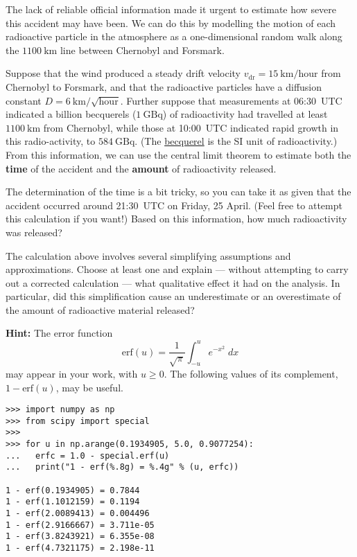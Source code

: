 \documentclass[12 pt]{article} %
\newcommand{\vdr}{\ensuremath{v_{\mathrm{dr}}} }
\newcommand{\showmarks}[1]{\rightline{\texttt{[#1 marks]}}} %
\begin{document}
The lack of reliable official information made it urgent to estimate how severe this accident may have been.
We can do this by modelling the motion of each radioactive particle in the atmosphere as a one-dimensional random walk along the $1100~\mathrm{km}$ line between Chernobyl and Forsmark.

Suppose that the wind produced a steady drift velocity $\vdr = 15~\mathrm{km}/\mathrm{hour}$ from Chernobyl to Forsmark, and that the radioactive particles have a diffusion constant $D = 6~\mathrm{km}/\sqrt{\mathrm{hour}}$.
Further suppose that measurements at 06:30~UTC indicated a billion becquerels ($1~\mathrm{GBq}$) of radioactivity had travelled at least $1100~\mathrm{km}$ from Chernobyl, while those at 10:00~UTC indicated rapid growth in this radio-activity, to $584~\mathrm{GBq}$.
(The \href{https://en.wikipedia.org/wiki/Becquerel}{becquerel} is the SI unit of radioactivity.)
From this information, we can use the central limit theorem to estimate both the \textbf{time} of the accident and the \textbf{amount} of radioactivity released.

\newpage %
The determination of the time is a bit tricky, so you can take it as given that the accident occurred around 21:30~UTC on Friday, 25 April.
(Feel free to attempt this calculation if you want!)
Based on this information, how much radioactivity was released?

\showmarks{25}

The calculation above involves several simplifying assumptions and approximations.
Choose at least one and explain --- without attempting to carry out a corrected calculation --- what qualitative effect it had on the analysis.
In particular, did this simplification cause an underestimate or an overestimate of the amount of radioactive material released?

\showmarks{10}

\textbf{Hint:} The error function
\begin{equation*}
  \mathrm{erf}(u) = \frac{1}{\sqrt{\pi}} \int_{-u}^u e^{-x^2} \; dx
\end{equation*}
may appear in your work, with $u \geq 0$.
The following values of its complement, $1 - \mathrm{erf}(u)$, may be useful.
\begin{verbatim}
>>> import numpy as np
>>> from scipy import special
>>>
>>> for u in np.arange(0.1934905, 5.0, 0.9077254):
...   erfc = 1.0 - special.erf(u)
...   print("1 - erf(%.8g) = %.4g" % (u, erfc))

1 - erf(0.1934905) = 0.7844
1 - erf(1.1012159) = 0.1194
1 - erf(2.0089413) = 0.004496
1 - erf(2.9166667) = 3.711e-05
1 - erf(3.8243921) = 6.355e-08
1 - erf(4.7321175) = 2.198e-11
\end{verbatim}
\end{document}
